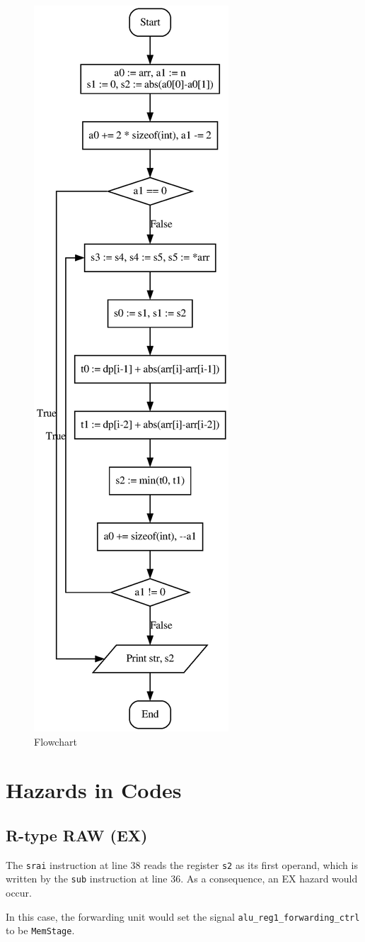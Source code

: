 \documentclass[12pt, a4paper]{article}
\begin{document}
\begin{figure}[H]
\centering
\includegraphics[width=.365\linewidth]{flowchart}
\caption{Flowchart}
\label{fig:fc}
\end{figure}

\section{Hazards in Codes}

\subsection{R-type RAW (EX)}

The \texttt{srai} instruction at line 38 reads the register \texttt{s2} as its first operand, which is written by the \texttt{sub} instruction at line 36. As a consequence, an EX hazard would occur.

In this case, the forwarding unit would set the signal \texttt{alu\_reg1\_forwarding\_ctrl} to be \texttt{MemStage}.
\end{document}
